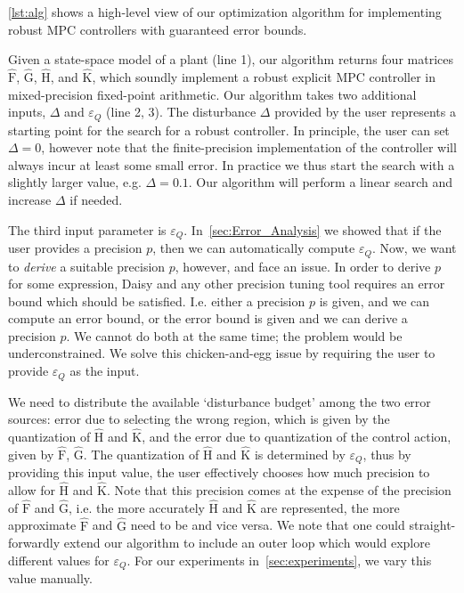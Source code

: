 \autoref{lst:alg} shows a high-level view of our optimization algorithm for
implementing robust MPC controllers with guaranteed error bounds.

Given a state-space model of a plant (line 1), our algorithm returns four matrices
$\hat{\text{F}}$, $\hat{\text{G}}$, $\hat{\text{H}}$, and $\hat{\text{K}}$,
which soundly implement a robust explicit MPC controller in mixed-precision
fixed-point arithmetic.
Our algorithm takes two additional inputs, $\Delta$ and $\varepsilon_Q$ (line 2, 3). 
The disturbance $\Delta$ provided by the user represents a starting point for 
the search for a robust controller. In principle, the user can set $\Delta = 0$,
however note that the finite-precision implementation of the controller will always
incur at least some small error. In practice we thus start the search with a slightly
larger value, e.g. $\Delta = 0.1$. Our algorithm will perform a linear search and
increase $\Delta$ if needed.

The third input parameter is $\varepsilon_Q$. In~\autoref{sec:Error_Analysis} we
showed that if the user provides a precision $p$, then we can automatically
compute $\varepsilon_Q$.
Now, we want to \emph{derive} a suitable precision $p$, however, and face an
issue. In order to derive $p$ for some expression, Daisy and any other precision
tuning tool requires an error bound which should be satisfied. I.e. either a
precision $p$ is given, and we can compute an error bound, or the error bound is
given and we can derive a precision $p$. We cannot do both at the same time; the
problem would be underconstrained. We solve this chicken-and-egg issue by
requiring the user to provide $\varepsilon_Q$ as the input.

We need to distribute the available `disturbance budget' among the two error
sources: error due to selecting the wrong region, which is given by the
quantization of $\hat{\text{H}}$ and $\hat{\text{K}}$, and the error due to
quantization of the control action, given by $\hat{\text{F}}$, $\hat{\text{G}}$.
The quantization of $\hat{\text{H}}$ and $\hat{\text{K}}$ is determined by
$\varepsilon_Q$, thus by providing this input value, the user effectively
chooses how much precision to allow for $\hat{\text{H}}$ and $\hat{\text{K}}$.
Note that this precision comes at the expense of the precision of
$\hat{\text{F}}$ and $\hat{\text{G}}$, i.e. the more accurately $\hat{\text{H}}$
and $\hat{\text{K}}$ are represented, the more approximate $\hat{\text{F}}$ and
$\hat{\text{G}}$ need to be and vice versa.
We note that one could straight-forwardly extend our algorithm to include an
outer loop which would explore different values for $\varepsilon_Q$. For our
experiments in~\autoref{sec:experiments}, we vary this value manually.


